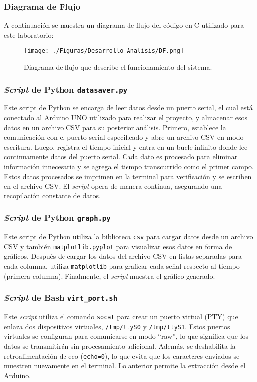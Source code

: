 \subsubsection{Diagrama de Flujo}
A continuación se muestra un diagrama de flujo del código en C utilizado para este laboratorio:

\begin{figure}[H]
    \centering
        \texttt{[image: ./Figuras/Desarrollo\_Analisis/DF.png]}
        \caption{Diagrama de flujo que describe el funcionamiento del sistema.}
    \end{figure}
\newpage


\subsubsection{\textit{Script} de Python \texttt{datasaver.py}}
Este script de Python se encarga de leer datos desde un puerto serial, el cual está conectado al Arduino UNO utilizado para realizar el proyecto, y almacenar esos datos en un archivo CSV para su posterior análisis. Primero, establece la comunicación con el puerto serial especificado y abre un archivo CSV en modo escritura. Luego, registra el tiempo inicial y entra en un bucle infinito donde lee continuamente datos del puerto serial. Cada dato es procesado para eliminar información innecesaria y se agrega el tiempo transcurrido como el primer campo. Estos datos procesados se imprimen en la terminal para verificación y se escriben en el archivo CSV. El \textit{script} opera de manera continua, asegurando una recopilación constante de datos.

\subsubsection{\textit{Script} de Python \texttt{graph.py}}
Este script de Python utiliza la biblioteca \texttt{csv} para cargar datos desde un archivo CSV y también \texttt{matplotlib.pyplot} para visualizar esos datos en forma de gráficos. Después de cargar los datos del archivo CSV en listas separadas para cada columna, utiliza \texttt{matplotlib} para graficar cada señal respecto al tiempo (primera columna). Finalmente, el \textit{script} muestra el gráfico generado. 

\subsubsection{\textit{Script} de Bash \texttt{virt\_port.sh}}
Este \textit{script} utiliza el comando \texttt{socat} para crear un puerto virtual (PTY) que enlaza dos dispositivos virtuales, \texttt{/tmp/ttyS0} y \texttt{/tmp/ttyS1}. Estos puertos virtuales se configuran para comunicarse en modo ``raw'', lo que significa que los datos se transmitirán sin procesamiento adicional. Además, se deshabilita la retroalimentación de eco (\texttt{echo=0}), lo que evita que los caracteres enviados se muestren nuevamente en el terminal. Lo anterior permite la extracción desde el Arduino. 

